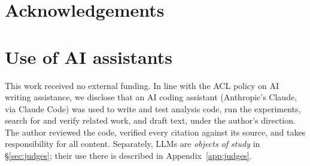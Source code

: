\documentclass[11pt]{article}
\begin{document}
\ifdefined\PREPRINT\section*{Acknowledgements}\else\section*{Use of AI assistants}\fi
\ifdefined\PREPRINT This work received no external funding. \fi In line with the ACL policy on AI writing assistance, we disclose that an AI coding assistant (Anthropic's Claude, via Claude Code) was used to write and test analysis code, run the experiments, search for and verify related work, and draft text, under the author's direction. The author reviewed the code, verified every citation against its source, and takes responsibility for all content. Separately, LLMs are \emph{objects of study} in \S\ref{sec:judges}; their use there is described in Appendix~\ref{app:judges}.



\appendix

\end{document}
